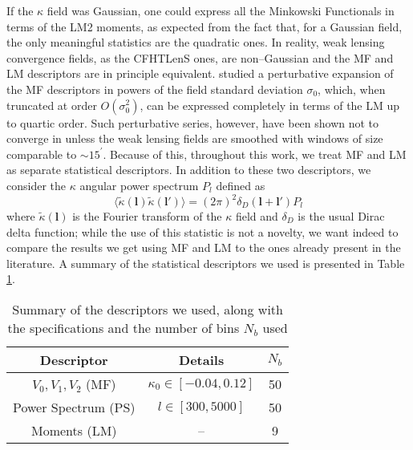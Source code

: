 \documentclass[reprint,aps,prd,superscriptaddress,showkeys,showpacs]{revtex4-1}
\begin{document}
%
If the $\kappa$ field was Gaussian, one could express all the Minkowski Functionals in terms of the LM2 moments, as expected from the fact that, for a Gaussian field, the only meaningful statistics are the quadratic ones. In reality, weak lensing convergence fields, as the CFHTLenS ones, are non--Gaussian and the MF and LM descriptors are in principle equivalent. \citep{Munshi12,Matsubara10} studied a perturbative expansion of the MF descriptors in powers of the field standard deviation $\sigma_0$, which, when truncated at order $O(\sigma_0^2)$, can be expressed completely in terms of the LM up to quartic order. Such perturbative series, however, have been shown not to converge in \citep{Petri2013} unless the weak lensing fields are smoothed with windows of size comparable to $\sim 15^\prime$. Because of this, throughout this work, we treat MF and LM as separate statistical descriptors. In addition to these two descriptors, we consider the $\kappa$ angular power spectrum $P_l$ defined as
\begin{equation}
\label{powerspectrum}
\langle\tilde{\kappa}(\mathbf{l})\tilde{\kappa}(\mathbf{l}')\rangle=(2\pi)^2\delta_D(\mathbf{l}+\mathbf{l}')P_l
\end{equation}  
%
%
where $\tilde{\kappa}(\mathbf{l})$ is the Fourier transform of the $\kappa$ field and $\delta_D$ is the usual Dirac delta function; while the use of this statistic is not a novelty, we want indeed to compare the results we get using MF and LM to the ones already present in the literature. A summary of the statistical descriptors we used is presented in Table \ref{desctable}. 
%
\begin{table}
\begin{tabular}{c|c|c} \hline
Descriptor & Details & $N_b$ \\ \hline
$V_0,V_1,V_2$ (MF) & $\kappa_0\in[-0.04,0.12]$ & 50 \\
Power Spectrum (PS) & $l \in [300,5000]$ & 50 \\
Moments (LM) & -- & 9 \\
\end{tabular}
\caption{Summary of the descriptors we used, along with the specifications and the number of bins $N_b$ used}
\label{desctable}
\end{table}
%
\end{document}
